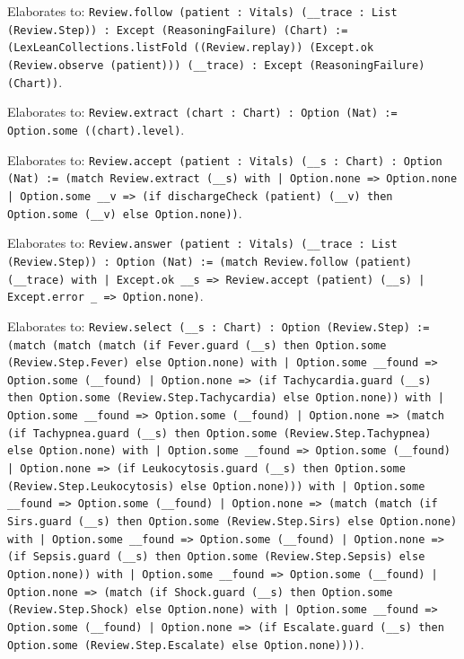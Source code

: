 \documentclass[11pt]{article}
\begin{document}
\noindent Elaborates to: \texttt{Review.follow (patient : Vitals) (\_\_trace : List (Review.Step)) : Except (ReasoningFailure) (Chart) := (LexLeanCollections.listFold ((Review.replay)) (Except.ok (Review.observe (patient))) (\_\_trace) : Except (ReasoningFailure) (Chart))}.\par
\noindent Elaborates to: \texttt{Review.extract (chart : Chart) : Option (Nat) := Option.some ((chart).level)}.\par
\noindent Elaborates to: \texttt{Review.accept (patient : Vitals) (\_\_s : Chart) : Option (Nat) := (match Review.extract (\_\_s) with | Option.none => Option.none | Option.some \_\_v => (if dischargeCheck (patient) (\_\_v) then Option.some (\_\_v) else Option.none))}.\par
\noindent Elaborates to: \texttt{Review.answer (patient : Vitals) (\_\_trace : List (Review.Step)) : Option (Nat) := (match Review.follow (patient) (\_\_trace) with | Except.ok \_\_s => Review.accept (patient) (\_\_s) | Except.error \_ => Option.none)}.\par
\noindent Elaborates to: \texttt{Review.select (\_\_s : Chart) : Option (Review.Step) := (match (match (match (if Fever.guard (\_\_s) then Option.some (Review.Step.Fever) else Option.none) with | Option.some \_\_found => Option.some (\_\_found) | Option.none => (if Tachycardia.guard (\_\_s) then Option.some (Review.Step.Tachycardia) else Option.none)) with | Option.some \_\_found => Option.some (\_\_found) | Option.none => (match (if Tachypnea.guard (\_\_s) then Option.some (Review.Step.Tachypnea) else Option.none) with | Option.some \_\_found => Option.some (\_\_found) | Option.none => (if Leukocytosis.guard (\_\_s) then Option.some (Review.Step.Leukocytosis) else Option.none))) with | Option.some \_\_found => Option.some (\_\_found) | Option.none => (match (match (if Sirs.guard (\_\_s) then Option.some (Review.Step.Sirs) else Option.none) with | Option.some \_\_found => Option.some (\_\_found) | Option.none => (if Sepsis.guard (\_\_s) then Option.some (Review.Step.Sepsis) else Option.none)) with | Option.some \_\_found => Option.some (\_\_found) | Option.none => (match (if Shock.guard (\_\_s) then Option.some (Review.Step.Shock) else Option.none) with | Option.some \_\_found => Option.some (\_\_found) | Option.none => (if Escalate.guard (\_\_s) then Option.some (Review.Step.Escalate) else Option.none))))}.\par
\end{document}
